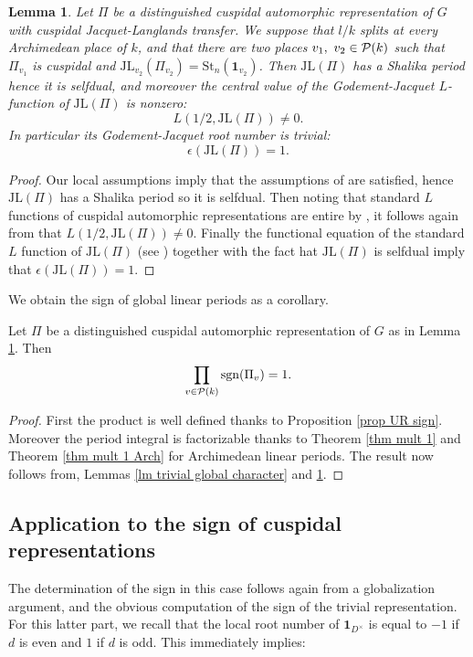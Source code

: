 \documentclass[11pt,letterpaper]{amsart}
\newcommand{\triv}{{\mathbf{1}}}
\newcommand{\JL}{{\mathrm{JL}}}
\def\1{\mathbf{1}}
\def\St{\mathrm{St}}
\theoremstyle{plain}
\newtheorem{lem}[thm]{Lemma}  \newtheorem{prop}[thm]{Proposition}
\numberwithin{equation}{section}
\newcommand{\sg}{\mathrm{sgn}}
\begin{document}
\begin{lem}\label{lm global root nb}
Let $\Pi$ be a distinguished cuspidal automorphic representation of $G$ with cuspidal Jacquet-Langlands transfer. We suppose that $l/k$ splits at every Archimedean place of $k$, and that there are two places $v_1, \ v_2 \in {\mathcal {P}}(k)$ such that $\Pi_{v_1}$ is cuspidal 
and $\JL_{v_2}(\Pi_{v_2})=\St_n(\triv_{v_2})$. Then $\JL(\Pi)$ has a Shalika period hence it is selfdual, and moreover the central value of the Godement-Jacquet $L$-function of $\JL(\Pi)$ is nonzero: \[L(1/2,\JL(\Pi))\neq 0.\] In particular its Godement-Jacquet root number is trivial: \[\epsilon(\JL(\Pi))=1.\]  
\end{lem}
\begin{proof}
Our local assumptions imply that the assumptions of \cite[Theorem 1.4]{XZ} are satisfied, hence $\JL(\Pi)$ has a Shalika period so it is selfdual. Then noting that standard $L$ functions of cuspidal automorphic representations are entire by \cite{GJ}, it follows again from 
\cite[Theorem 1.4]{XZ} that $L(1/2,\JL(\Pi))\neq 0$. Finally the functional equation of the standard $L$ function of $\JL(\Pi)$ (see \cite{GJ}) together with the fact hat $\JL(\Pi)$ is selfdual imply that $\epsilon(\JL(\Pi))=1$. 
\end{proof}

We obtain the sign of global linear periods as a corollary.

\begin{cor}\label{cor global sign}
Let $\Pi$ be a distinguished cuspidal automorphic representation of $G$ as in Lemma \ref{lm global root nb}. Then 
\[\prod_{v\in \CP(k)} \sg(\Pi_v)=1.\]
\end{cor}
\begin{proof}
First the product is well defined thanks to Proposition \ref{prop UR sign}. Moreover the period integral is factorizable thanks to Theorem \ref{thm mult 1} and Theorem \ref{thm mult 1 Arch} for Archimedean linear periods. The result now follows from, Lemmas 
\ref{lm trivial global character} and \ref{lm global root nb}.
\end{proof} 


\subsection{Application to the sign of cuspidal representations}

The determination of the sign in this case follows again from a globalization argument, and the obvious computation of the sign of the trivial representation. For this latter part, we recall that the local root number of 
$\1_{D^\times}$ is equal to $-1$ if $d$ is even and $1$ if $d$ is odd. This immediately implies:
\end{document}
